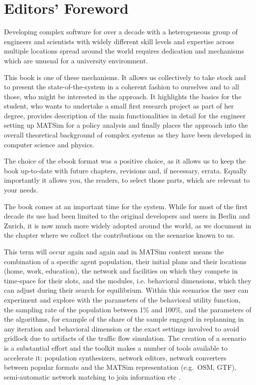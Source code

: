 \chapter*{Editors' Foreword}
Developing complex software for over a decade with a heterogeneous group of engineers and scientists with widely different skill levels and expertise across multiple locations spread around the world requires dedication and mechanisms which are unusual for a university environment. 

This book is one of these mechanisms. It allows us collectively to take stock and to present the state-of-the-system in a coherent fashion to ourselves and to all those, who might be interested in the approach. It highlights the basics for the student, who wants to undertake a small  first research project as part of her degree, provides description of the main functionalities in detail for the engineer setting up MATSim for a policy analysis and finally places the approach into the overall theoretical background of complex systems as they have been developed in computer science and physics. 

The choice of the ebook format was a positive choice, as it allows us to keep the book up-to-date with future chapters, revisions and, if necessary, errata. Equally importantly it allows you, the readers, to select those parts, which are relevant to your needs. 

The book comes at an important time for the system. While for most of the first decade its use had been limited to the original developers and users in Berlin and Zurich, it is now much more widely adopted around the world, as we document in the chapter where we collect the contributions on the scenarios known  to us. 

This term will occur again and again and in MATSim context means the combination of a specific agent population, their initial plans and their locations (home, work, education), the network and facilities on which they compete in time-space for their slots, and the modules, i.e. behavioral dimensions, which they can adjust during their search for equilibrium. Within this scenarios the user can experiment and explore with the parameters of the behavioral utility function, the sampling rate of the population between 1\% and 100\%, and the parameters of the algorithms, for example of the share of the sample engaged in replanning in any iteration and behavioral dimension or the exact settings involved to avoid gridlock due to artifacts of the traffic flow simulation. The creation of a scenario is a substantial effort and the toolkit makes a number of tools available to accelerate it: population synthesizers, network editors, network converters between popular formats and the MATSim representation (e.g.\ OSM, GTF), semi-automatic network matching to join information etc .

